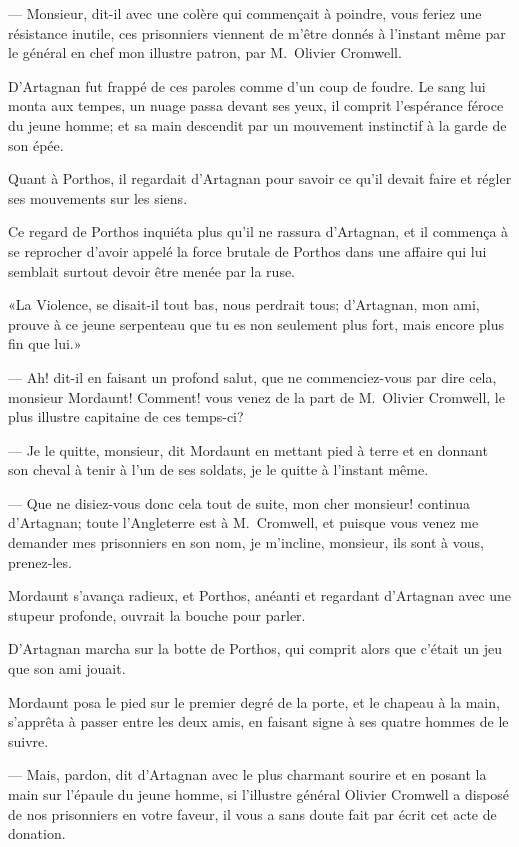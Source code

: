 — Monsieur, dit-il avec une colère qui commençait à poindre, vous feriez une résistance inutile, ces prisonniers viennent de m'être donnés à l'instant même par le général en chef mon illustre patron, par M.~Olivier Cromwell.

D'Artagnan fut frappé de ces paroles comme d'un coup de foudre. Le sang lui monta aux tempes, un nuage passa devant ses yeux, il comprit l'espérance féroce du jeune homme; et sa main descendit par un mouvement instinctif à la garde de son épée.

Quant à Porthos, il regardait d'Artagnan pour savoir ce qu'il devait faire et régler ses mouvements sur les siens.

Ce regard de Porthos inquiéta plus qu'il ne rassura d'Artagnan, et il commença à se reprocher d'avoir appelé la force brutale de Porthos dans une affaire qui lui semblait surtout devoir être menée par la ruse.

«La Violence, se disait-il tout bas, nous perdrait tous; d'Artagnan, mon ami, prouve à ce jeune serpenteau que tu es non seulement plus fort, mais encore plus fin que lui.»

— Ah! dit-il en faisant un profond salut, que ne commenciez-vous par dire cela, monsieur Mordaunt! Comment! vous venez de la part de M.~Olivier Cromwell, le plus illustre capitaine de ces temps-ci?

— Je le quitte, monsieur, dit Mordaunt en mettant pied à terre et en donnant son cheval à tenir à l'un de ses soldats, je le quitte à l'instant même.

— Que ne disiez-vous donc cela tout de suite, mon cher monsieur! continua d'Artagnan; toute l'Angleterre est à M.~Cromwell, et puisque vous venez me demander mes prisonniers en son nom, je m'incline, monsieur, ils sont à vous, prenez-les.

Mordaunt s'avança radieux, et Porthos, anéanti et regardant d'Artagnan avec une stupeur profonde, ouvrait la bouche pour parler.

D'Artagnan marcha sur la botte de Porthos, qui comprit alors que c'était un jeu que son ami jouait.

Mordaunt posa le pied sur le premier degré de la porte, et le chapeau à la main, s'apprêta à passer entre les deux amis, en faisant signe à ses quatre hommes de le suivre.

— Mais, pardon, dit d'Artagnan avec le plus charmant sourire et en posant la main sur l'épaule du jeune homme, si l'illustre général Olivier Cromwell a disposé de nos prisonniers en votre faveur, il vous a sans doute fait par écrit cet acte de donation.

